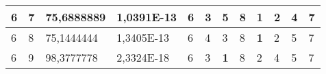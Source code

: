 \documentclass[conference]{IEEEtran}
\begin{document}
\begin{table*}[]
\begin{tabular}{|llll|llllllll|}
\multicolumn{1}{|l|}{6}                                                     & \multicolumn{1}{l|}{7}                                                        & \multicolumn{1}{l|}{75,6888889}                                                   & 1,0391E-13                     & \multicolumn{1}{l|}{6}                                                  & \multicolumn{1}{l|}{3}                                                  & \multicolumn{1}{l|}{5}                                                  & \multicolumn{1}{l|}{8}                                                  & \multicolumn{1}{l|}{\textbf{1}}                                         & \multicolumn{1}{l|}{2}                                                  & \multicolumn{1}{l|}{4}                                                  & 7                          \\ \hline
\multicolumn{1}{|l|}{6}                                                     & \multicolumn{1}{l|}{8}                                                        & \multicolumn{1}{l|}{75,1444444}                                                   & 1,3405E-13                     & \multicolumn{1}{l|}{6}                                                  & \multicolumn{1}{l|}{4}                                                  & \multicolumn{1}{l|}{3}                                                  & \multicolumn{1}{l|}{8}                                                  & \multicolumn{1}{l|}{\textbf{1}}                                         & \multicolumn{1}{l|}{2}                                                  & \multicolumn{1}{l|}{5}                                                  & 7                          \\ \hline
\multicolumn{1}{|l|}{6}                                                     & \multicolumn{1}{l|}{9}                                                        & \multicolumn{1}{l|}{98,3777778}                                                   & 2,3324E-18                     & \multicolumn{1}{l|}{6}                                                  & \multicolumn{1}{l|}{3}                                                  & \multicolumn{1}{l|}{\textbf{1}}                                         & \multicolumn{1}{l|}{8}                                                  & \multicolumn{1}{l|}{2}                                                  & \multicolumn{1}{l|}{4}                                                  & \multicolumn{1}{l|}{5}                                                  & 7                          \\ \hline

\end{tabular}
\end{table*}
\end{document}
